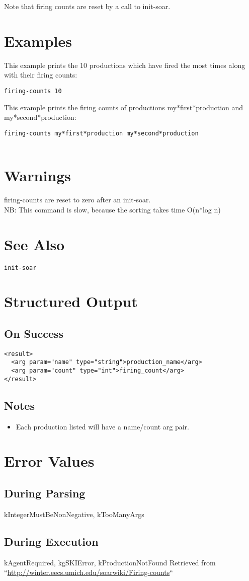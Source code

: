 \documentclass[10pt]{article}
\begin{document}
 Note that firing counts are reset by a call to init-soar. 
\section*{ Examples }


 This example prints the 10 productions which have fired the most times along with their firing counts: \begin{verbatim}
firing-counts 10

\end{verbatim}



 This example prints the firing counts of productions my*first*production and my*second*production: \begin{verbatim}
firing-counts my*first*production my*second*production


\end{verbatim}

\section*{ Warnings }


 firing-counts are reset to zero after an init-soar. \\ 
 NB: This command is slow, because the sorting takes time O(n*log n) 
\section*{ See Also }
\begin{verbatim}
init-soar

\end{verbatim}
\section*{ Structured Output }
\subsection*{ On Success }
\begin{verbatim}
<result>
  <arg param="name" type="string">production_name</arg>
  <arg param="count" type="int">firing_count</arg>
</result>

\end{verbatim}
\subsection*{ Notes }
\begin{itemize}
\item  Each production listed will have a name/count arg pair. 

\end{itemize}
\section*{ Error Values }
\subsection*{ During Parsing }


 kIntegerMustBeNonNegative, kTooManyArgs
\subsection*{ During Execution }


 kAgentRequired, kgSKIError, kProductionNotFound Retrieved from ``\url{http://winter.eecs.umich.edu/soarwiki/Firing-counts}``
\end{document}
